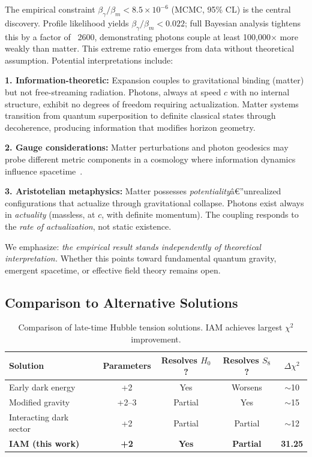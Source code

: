 \documentclass[twocolumn,superscriptaddress,prl,amsmath,amssymb]{revtex4-2}
\begin{document}
The empirical constraint $\beta_\gamma/\beta_m < 8.5 \times 10^{-6}$ (MCMC, 95\% CL) is the central discovery. Profile likelihood yields $\beta_\gamma/\beta_m < 0.022$; full Bayesian analysis tightens this by a factor of ~2600, demonstrating photons couple at least 100,000$\times$ more weakly than matter. This extreme ratio emerges from data without theoretical assumption. Potential interpretations include:

\textbf{1. Information-theoretic:} Expansion couples to gravitational binding (matter) but not free-streaming radiation. Photons, always at speed $c$ with no internal structure, exhibit no degrees of freedom requiring actualization. Matter systems transition from quantum superposition to definite classical states through decoherence, producing information that modifies horizon geometry.

\textbf{2. Gauge considerations:} Matter perturbations and photon geodesics may probe different metric components in a cosmology where information dynamics influence spacetime~\cite{Bardeen1980}.

\textbf{3. Aristotelian metaphysics:} Matter possesses \textit{potentiality}â€”unrealized configurations that actualize through gravitational collapse. Photons exist always in \textit{actuality} (massless, at $c$, with definite momentum). The coupling responds to the \textit{rate of actualization}, not static existence.

We emphasize: \textit{the empirical result stands independently of theoretical interpretation.} Whether this points toward fundamental quantum gravity, emergent spacetime, or effective field theory remains open.

\subsection{Comparison to Alternative Solutions}

\begin{table}[t]
\centering
\begin{tabular}{lcccc}
\hline\hline
Solution & Parameters & Resolves $H_0$? & Resolves $S_8$? & $\Delta\chi^2$ \\
\hline
Early dark energy~\cite{Kamionkowski2023} & +2 & Yes & Worsens & $\sim$10 \\
Modified gravity~\cite{Amendola2020} & +2--3 & Partial & Yes & $\sim$15 \\
Interacting dark sector~\cite{DiValentino2021} & +2 & Partial & Partial & $\sim$12 \\
\textbf{IAM (this work)} & \textbf{+2} & \textbf{Yes} & \textbf{Partial} & \textbf{31.25} \\
\hline\hline
\end{tabular}
\caption{Comparison of late-time Hubble tension solutions. IAM achieves largest $\chi^2$ improvement.}
\end{table}
\end{document}
